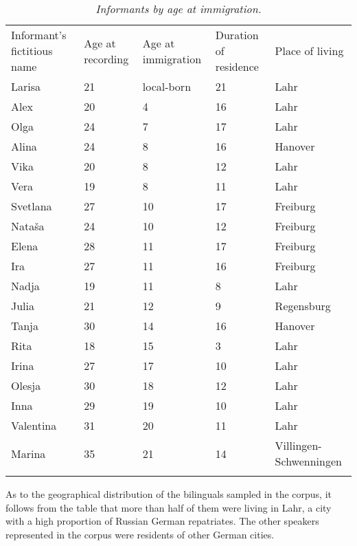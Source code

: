 \begin{table} 
\begin{small}
		\begin{tabular}{p{6.5em}<{\raggedright}p{5.5em}<{\raggedright}p{5.5em}<{\raggedright}p{5.5em}<{\raggedright}p{6.5em}<{\raggedright}} \midrule
			\addlinespace[2mm]
			Informant's fictitious name & Age at recording & Age at immigration & Duration of residence & Place of living\\ \addlinespace[2mm] \midrule
			\addlinespace[2mm]
		Larisa & 21 & local-born & 21 & Lahr\\
		Alex & 20 & 4 & 16 & Lahr\\
		Olga & 24 & 7 & 17 & Lahr\\
		Alina & 24 & 8 & 16 & Hanover\\
		Vika & 20 & 8 & 12 & Lahr\\
		Vera & 19 & 8 & 11 & Lahr\\	
		Svetlana & 27 & 10 & 17 & Freiburg\\
		Nataša & 24 & 10 & 12 & Freiburg\\
		Elena & 28 & 11 & 17 & Freiburg\\
		Ira & 27 & 11 & 16 & Freiburg\\
		Nadja & 19 & 11 & 8 & Lahr\\
		Julia & 21 & 12 & 9 & Regensburg\\
		Tanja & 30 & 14 & 16 & Hanover\\
		Rita & 18 & 15 & 3 & Lahr\\
		Irina & 27 & 17 & 10 & Lahr\\
		Olesja & 30 & 18 & 12 & Lahr\\
		Inna & 29 & 19 & 10 & Lahr\\
		Valentina & 31 & 20 & 11 & Lahr\\
		Marina & 35 & 21	& 14 & Villingen-Schwenningen\\
		\addlinespace[2mm]
		\midrule
	\end{tabular}
\end{small}
	\caption{\textit{Informants by age at immigration.}}\label{tab:3:3}
\end{table}

As to the geographical distribution of the bilinguals sampled in the corpus, it follows from the table that more than half of them were living in Lahr, a city with a high proportion of Russian German repatriates. The other speakers represented in the corpus were residents of other German cities.

